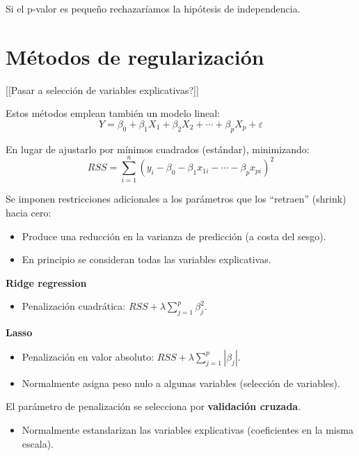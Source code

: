 \documentclass[]{book}
\providecommand{\tightlist}{%
  \setlength{\itemsep}{0pt}\setlength{\parskip}{0pt}}
\begin{document}
Si el p-valor es pequeño rechazaríamos la hipótesis de independencia.

\hypertarget{metodos-de-regularizacion}{%
\section{Métodos de regularización}\label{metodos-de-regularizacion}}

{[}{[}Pasar a selección de variables explicativas?{]}{]}

Estos métodos emplean también un modelo lineal:
\[Y=\beta_{0}+\beta_{1}X_{1}+\beta_{2}X_{2}+\cdots+\beta_{p}X_{p}+\varepsilon\]

En lugar de ajustarlo por mínimos cuadrados (estándar), minimizando:
\[ RSS = \sum\limits_{i=1}^{n}\left(  y_{i} - \beta_0 - \beta_1 x_{1i} - \cdots - \beta_p x_{pi} \right)^{2}\]

Se imponen restricciones adicionales a los parámetros que los
``retraen'' (shrink) hacia cero:

\begin{itemize}
\item
  Produce una reducción en la varianza de predicción (a
  costa del sesgo).
\item
  En principio se consideran todas las variables explicativas.
\end{itemize}

\textbf{Ridge regression}

\begin{itemize}
\tightlist
\item
  Penalización cuadrática: \(RSS+\lambda\sum_{j=1}^{p}\beta_{j}^{2}\).
\end{itemize}

\textbf{Lasso}

\begin{itemize}
\item
  Penalización en valor absoluto: \(RSS+\lambda\sum_{j=1}^{p}|\beta_{j}|\).
\item
  Normalmente asigna peso nulo a algunas variables
  (selección de variables).
\end{itemize}

El parámetro de penalización se selecciona por \textbf{validación cruzada}.

\begin{itemize}
\tightlist
\item
  Normalmente estandarizan las variables explicativas
  (coeficientes en la misma escala).
\end{itemize}
\end{document}
